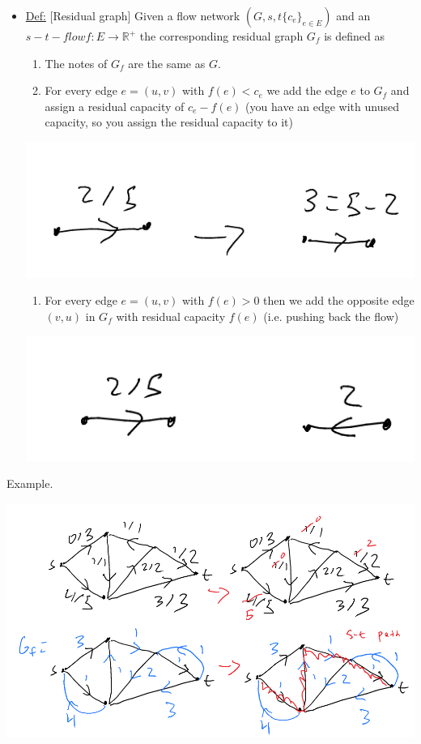\documentclass[11pt]{article}
\begin{document}
\begin{itemize}
\item \uline{Def:} [Residual graph] Given a flow network \((G,s,t\{c_e\}_{e \in E})\) and an \(s-t-flow f:E \to \mathbb{R}^{+}\) the corresponding residual graph \(G_f\) is defined as 
\begin{enumerate}
\item The notes of \(G_f\) are the same as \(G\).
\item For every edge \(e = (u,v)\) with \(f(e)<c_e\) we add the edge \(e\) to \(G_f\) and assign a residual capacity of \(c_e - f(e)\) (you have an edge with unused capacity, so you assign the residual capacity to it)
\end{enumerate}
\begin{center}
\includegraphics[width=.9\linewidth]{./Images/i110.png}
\end{center}
\begin{enumerate}
\item For every edge \(e=(u,v)\) with \(f(e)>0\) then we add the opposite edge \((v,u)\) in \(G_f\) with residual capacity \(f(e)\) (i.e. pushing back the flow)
\end{enumerate}
\begin{center}
\includegraphics[width=.9\linewidth]{./Images/i111.png}
\end{center}
\end{itemize}
Example.
\begin{center}
\includegraphics[width=.9\linewidth]{./Images/i112.png}
\end{center}
\end{document}
